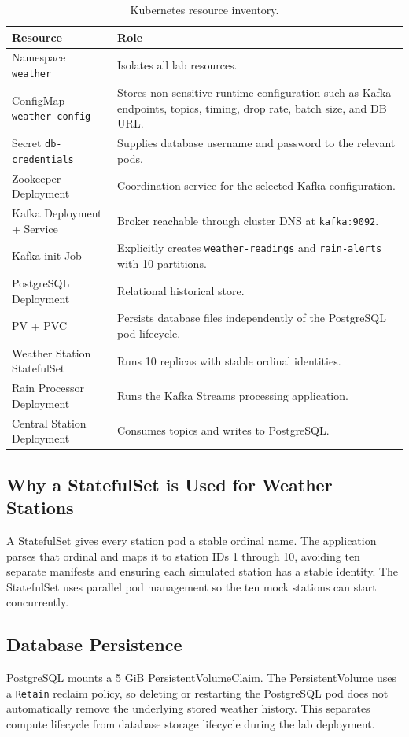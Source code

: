 \documentclass[12pt,a4paper]{article}
\begin{document}
\begin{table}[H]
\centering
\caption{Kubernetes resource inventory.}
\begin{tabularx}{\textwidth}{l X}
\toprule
\textbf{Resource} & \textbf{Role} \\
\midrule
Namespace \texttt{weather} & Isolates all lab resources. \\
ConfigMap \texttt{weather-config} & Stores non-sensitive runtime configuration such as Kafka endpoints, topics, timing, drop rate, batch size, and DB URL. \\
Secret \texttt{db-credentials} & Supplies database username and password to the relevant pods. \\
Zookeeper Deployment & Coordination service for the selected Kafka configuration. \\
Kafka Deployment + Service & Broker reachable through cluster DNS at \texttt{kafka:9092}. \\
Kafka init Job & Explicitly creates \texttt{weather-readings} and \texttt{rain-alerts} with 10 partitions. \\
PostgreSQL Deployment & Relational historical store. \\
PV + PVC & Persists database files independently of the PostgreSQL pod lifecycle. \\
Weather Station StatefulSet & Runs 10 replicas with stable ordinal identities. \\
Rain Processor Deployment & Runs the Kafka Streams processing application. \\
Central Station Deployment & Consumes topics and writes to PostgreSQL. \\
\bottomrule
\end{tabularx}
\end{table}

\subsection{Why a StatefulSet is Used for Weather Stations}
A StatefulSet gives every station pod a stable ordinal name. The application parses that ordinal and maps it to station IDs 1 through 10, avoiding ten separate manifests and ensuring each simulated station has a stable identity. The StatefulSet uses parallel pod management so the ten mock stations can start concurrently.

\subsection{Database Persistence}
PostgreSQL mounts a 5 GiB PersistentVolumeClaim. The PersistentVolume uses a \texttt{Retain} reclaim policy, so deleting or restarting the PostgreSQL pod does not automatically remove the underlying stored weather history. This separates compute lifecycle from database storage lifecycle during the lab deployment.
\end{document}
